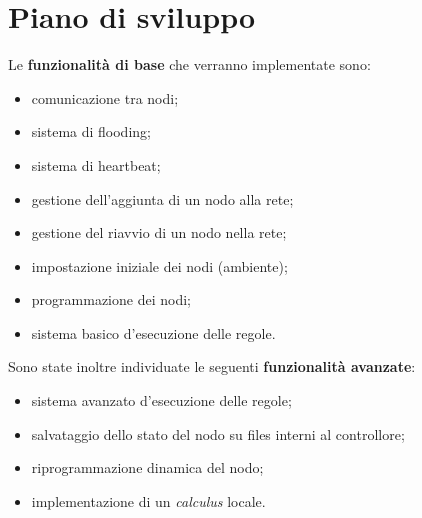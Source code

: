 \documentclass{memoir}
\begin{document}
\section{Piano di sviluppo}
Le \textbf{funzionalità di base} che verranno implementate sono:
\begin{itemize}
	\item comunicazione tra nodi;
	\item sistema di flooding;
	\item sistema di heartbeat;
	\item gestione dell'aggiunta di un nodo alla rete;
	\item gestione del riavvio di un nodo nella rete;
	\item impostazione iniziale dei nodi (ambiente);
	\item programmazione dei nodi;
	\item sistema basico d'esecuzione delle regole.
\end{itemize}
Sono state inoltre individuate le seguenti \textbf{funzionalità avanzate}:
\begin{itemize}
	\item sistema avanzato d'esecuzione delle regole;
	\item salvataggio dello stato del nodo su files interni al controllore;
	\item riprogrammazione dinamica del nodo;
	\item implementazione di un \emph{calculus} locale.
\end{itemize}

%
%
%
%
%
\end{document}

